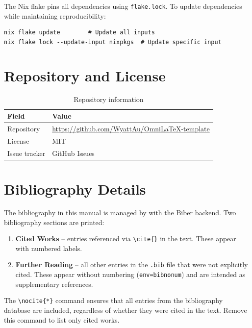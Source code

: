 The Nix flake pins all dependencies using \texttt{flake.lock}.  To update
dependencies while maintaining reproducibility:

\begin{verbatim}
nix flake update        # Update all inputs
nix flake lock --update-input nixpkgs  # Update specific input
\end{verbatim}

\section*{Repository and License}

\begin{table}[htbp]
    \centering
    \caption{Repository information}
    \label{tab:colophon-repo}
    \begin{tabular}{@{} l l @{}}
        \toprule
        \textbf{Field} & \textbf{Value} \\
        \midrule
        Repository      & \url{https://github.com/WyattAu/OmniLaTeX-template} \\
        License         & MIT \\
        Issue tracker   & GitHub Issues \\
        \bottomrule
    \end{tabular}
\end{table}

\section*{Bibliography Details}

The bibliography in this manual is managed by  with the
Biber backend.  Two bibliography sections are printed:

\begin{enumerate}
    \item \textbf{Cited Works} -- entries referenced via
          \verb|\cite{}| in the text.  These appear with numbered labels.
    \item \textbf{Further Reading} -- all other entries in the
          \texttt{.bib} file that were not explicitly cited.  These appear
          without numbering (\texttt{env=bibnonum}) and are intended as
          supplementary references.
\end{enumerate}

The \verb|\nocite{*}| command ensures that all entries from the
bibliography database are included, regardless of whether they were cited
in the text.  Remove this command to list only cited works.

